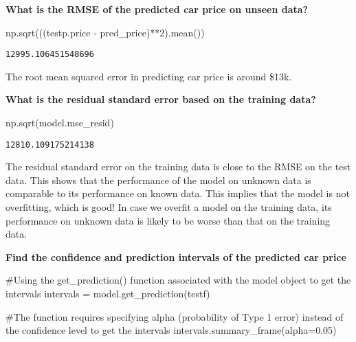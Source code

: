 \documentclass[
  letterpaper,
  DIV=11,
  numbers=noendperiod]{scrreprt}
\newenvironment{Shaded}{\begin{snugshade}}{\end{snugshade}}
\newcommand{\CommentTok}[1]{\textcolor[rgb]{0.37,0.37,0.37}{#1}}
\newcommand{\DecValTok}[1]{\textcolor[rgb]{0.68,0.00,0.00}{#1}}
\newcommand{\FloatTok}[1]{\textcolor[rgb]{0.68,0.00,0.00}{#1}}
\newcommand{\NormalTok}[1]{\textcolor[rgb]{0.00,0.23,0.31}{#1}}
\newcommand{\OperatorTok}[1]{\textcolor[rgb]{0.37,0.37,0.37}{#1}}
\begin{document}
\textbf{What is the RMSE of the predicted car price on unseen data?}

\begin{Shaded}
\begin{Highlighting}[]
\NormalTok{np.sqrt(((testp.price }\OperatorTok{{-}}\NormalTok{ pred\_price)}\OperatorTok{**}\DecValTok{2}\NormalTok{).mean())}
\end{Highlighting}
\end{Shaded}

\begin{verbatim}
12995.106451548696
\end{verbatim}

The root mean squared error in predicting car price is around \$13k.

\textbf{What is the residual standard error based on the training data?}

\begin{Shaded}
\begin{Highlighting}[]
\NormalTok{np.sqrt(model.mse\_resid)}
\end{Highlighting}
\end{Shaded}

\begin{verbatim}
12810.109175214138
\end{verbatim}

The residual standard error on the training data is close to the RMSE on
the test data. This shows that the performance of the model on unknown
data is comparable to its performance on known data. This implies that
the model is not overfitting, which is good! In case we overfit a model
on the training data, its performance on unknown data is likely to be
worse than that on the training data.

\textbf{Find the confidence and prediction intervals of the predicted
car price}

\begin{Shaded}
\begin{Highlighting}[]
\CommentTok{\#Using the get\_prediction() function associated with the \textquotesingle{}model\textquotesingle{} object to get the intervals}
\NormalTok{intervals }\OperatorTok{=}\NormalTok{ model.get\_prediction(testf)}
\end{Highlighting}
\end{Shaded}

\begin{Shaded}
\begin{Highlighting}[]
\CommentTok{\#The function requires specifying alpha (probability of Type 1 error) instead of the confidence level to get the intervals}
\NormalTok{intervals.summary\_frame(alpha}\OperatorTok{=}\FloatTok{0.05}\NormalTok{)}
\end{Highlighting}
\end{Shaded}
\end{document}
